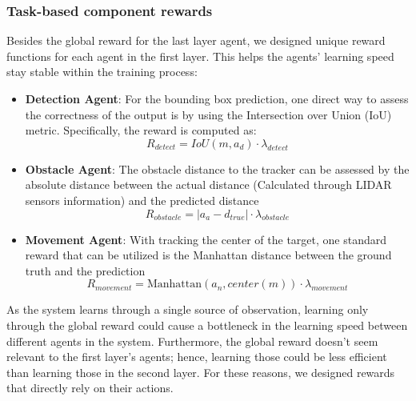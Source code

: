 \documentclass[sigconf]{aamas}
\begin{document}
\subsubsection{Task-based component rewards}
Besides the global reward for the last layer agent, we designed unique reward functions for each agent in the first layer. This helps the agents' learning speed stay stable within the training process:
\begin{itemize}
    \item \textbf{Detection Agent}: For the bounding box prediction, one direct way to assess the correctness of the output is by using the Intersection over Union (IoU) metric. Specifically, the reward is computed as:
    \begin{equation}
    R_{detect} = IoU(m, a_d) \cdot \lambda_{detect}
    \end{equation}
    \item \textbf{Obstacle Agent}: The obstacle distance to the tracker can be assessed by the absolute distance between the actual distance (Calculated through LIDAR sensors information) and the predicted distance
    \begin{equation}
    R_{obstacle} = |a_a - d_{true}| \cdot \lambda_{obstacle}
    \end{equation}
    \item \textbf{Movement Agent}: With tracking the center of the target, one standard reward that can be utilized is the Manhattan distance between the ground truth and the prediction
    \begin{equation}
    R_{movement} = \text{Manhattan}(a_n, center(m)) \cdot \lambda_{movement}
    \end{equation}
\end{itemize}
As the system learns through a single source of observation, learning only through the global reward could cause a bottleneck in the learning speed between different agents in the system. Furthermore, the global reward doesn't seem relevant to the first layer's agents; hence, learning those could be less efficient than learning those in the second layer. For these reasons, we designed rewards that directly rely on their actions. 
\end{document}
